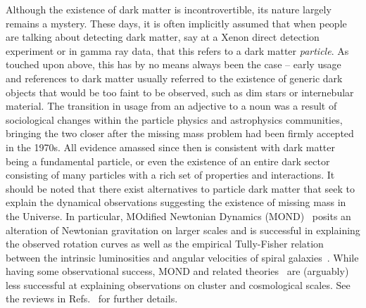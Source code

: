 Although the existence of dark matter is incontrovertible, its nature largely remains a mystery. These days, it is often implicitly assumed that when people are talking about detecting dark matter, say at a Xenon direct detection experiment or in gamma ray data, that this refers to a dark matter \emph{particle}. As touched upon above, this has by no means always been the case -- early usage and references to dark matter usually referred to the existence of generic dark objects that would be too faint to be observed, such as dim stars or internebular material. The transition in usage from an adjective to a noun was a result of sociological changes within the particle physics and astrophysics communities, bringing the two closer after the missing mass problem had been firmly accepted in the 1970s. All evidence amassed since then is consistent with dark matter being a fundamental particle, or even the existence of an entire dark sector consisting of many particles with a rich set of properties and interactions. It should be noted that there exist alternatives to particle dark matter that seek to explain the dynamical observations suggesting the existence of missing mass in the Universe. In particular, MOdified Newtonian Dynamics (MOND)~\cite{1983ApJ...270..365M,1983ApJ...270..371M,1983ApJ...270..384M} posits an alteration of Newtonian gravitation on larger scales and is successful in explaining the observed rotation curves as well as the empirical Tully-Fisher relation between the intrinsic luminosities and angular velocities of spiral galaxies~\cite{1977A&A....54..661T}. While having some observational success, MOND and related theories~\cite{Bekenstein:2004ne} are (arguably) less successful at explaining observations on cluster and cosmological scales. See the reviews in Refs.~\cite{2009CQGra..26n3001S,Famaey:2011kh} for further details.

